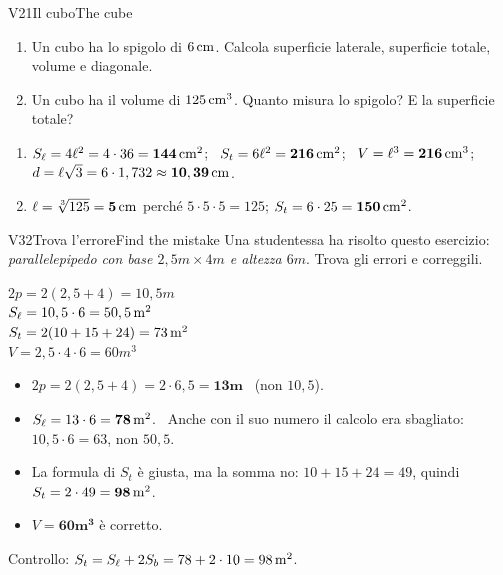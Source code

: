 \begin{esercizio}{V2}{1}{Il cubo}{The cube}
\begin{enumerate}
\item Un cubo ha lo spigolo di $6\,\mathrm{cm}$. Calcola superficie laterale, superficie totale, volume e diagonale.
\item Un cubo ha il volume di $125\,\mathrm{cm^3}$. Quanto misura lo spigolo? E la superficie totale?
\end{enumerate}
\end{esercizio}
\begin{solbox}
\begin{enumerate}
\item $S_\ell=4\ell^2=4\cdot36=\mathbf{144\,\mathrm{cm^2}}$; \ $S_t=6\ell^2=\mathbf{216\,\mathrm{cm^2}}$; \ $V=\ell^3=\mathbf{216\,\mathrm{cm^3}}$; \ $d=\ell\sqrt3=6\cdot1,732\approx\mathbf{10,39\,\mathrm{cm}}$.
\item $\ell=\sqrt[3]{125}=\mathbf{5\,\mathrm{cm}}$ perché $5\cdot5\cdot5=125$; \quad $S_t=6\cdot25=\mathbf{150\,\mathrm{cm^2}}$.
\end{enumerate}
\end{solbox}

\begin{esercizio}{V3}{2}{Trova l'errore}{Find the mistake}
Una studentessa ha risolto questo esercizio: \emph{parallelepipedo con base $2,5\unit{m}\times4\unit{m}$ e altezza $6\unit{m}$}. Trova gli errori e correggili.
\begin{center}
\begin{tcolorbox}[width=0.62\linewidth, colback=white, colframe=black!30, boxrule=0.4pt, arc=1pt, left=8pt]
\small
$2p=2(2,5+4)=10,5\unit{m}$\\
$S_\ell=10,5\cdot6=50,5\,\mathrm{m^2}$\\
$S_t=2(10+15+24)=73\,\mathrm{m^2}$\\
$V=2,5\cdot4\cdot6=60\unit{m^3}$
\end{tcolorbox}
\end{center}
\end{esercizio}
\begin{solbox}
\begin{itemize}
\item $2p=2(2,5+4)=2\cdot6,5=\mathbf{13\unit{m}}$ \ (non $10,5$).
\item $S_\ell=13\cdot6=\mathbf{78\,\mathrm{m^2}}$. \ Anche con il suo numero il calcolo era sbagliato: $10,5\cdot6=63$, non $50,5$.
\item La formula di $S_t$ è giusta, ma la somma no: $10+15+24=49$, quindi $S_t=2\cdot49=\mathbf{98\,\mathrm{m^2}}$.
\item $V=\mathbf{60\unit{m^3}}$ è corretto.
\end{itemize}
Controllo: $S_t=S_\ell+2S_b=78+2\cdot10=98\,\mathrm{m^2}$. \checkmark
{}
\end{solbox}

